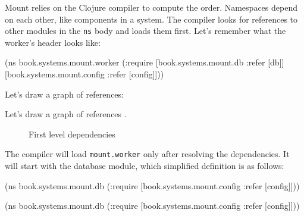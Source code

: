 Mount relies on the Clojure compiler to compute the order. Namespaces depend on each other, like components in a system. The compiler looks for references to other modules in the \verb|ns| body and loads them first. Let's remember what the worker's header looks like:

\begin{english}
  \begin{clojure}
(ns book.systems.mount.worker
  (:require
   [book.systems.mount.db :refer [db]]
   [book.systems.mount.config
     :refer [config]]))
  \end{clojure}
\end{english}


\ifprint

\noindent
Let's draw a graph of references:

\begin{figure}[h!]
\end{figure}

\fi

\ifebook

\noindent
Let's draw a graph of references .

\begin{figure}[ht!]
  \caption{First level dependencies}
  \label{fig:chart-sys-2}
\end{figure}

\fi

The compiler will load \verb|mount.worker| only after resolving the dependencies. It will start with the database module, which simplified definition is as follows:

\ifnarrow

\begin{english}
  \begin{clojure}
(ns book.systems.mount.db
  (:require
   [book.systems.mount.config
    :refer [config]]))
  \end{clojure}
\end{english}

\else

\begin{english}
  \begin{clojure}
(ns book.systems.mount.db
  (:require
   [book.systems.mount.config :refer [config]]))
  \end{clojure}
\end{english}

\fi

